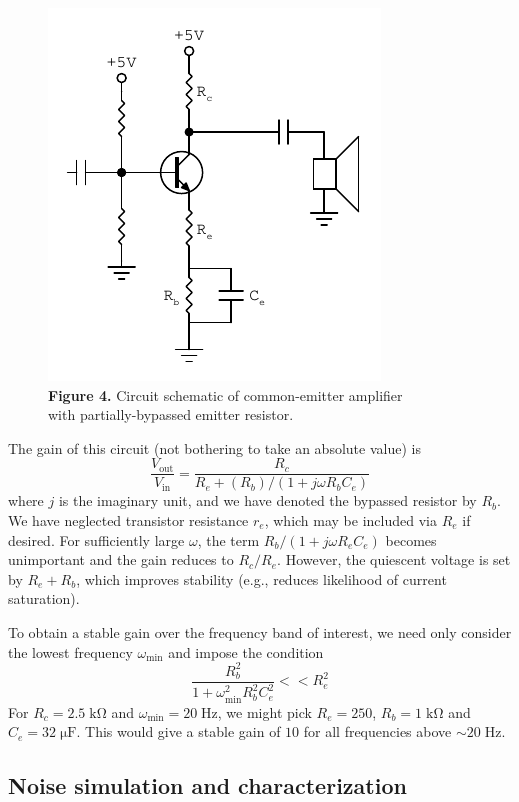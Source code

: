\documentclass[11pt]{article}
\newcommand {\mt}{\mathrm}
\newcommand {\unit}[1]{\; \mt{#1}}
\begin{document}
\begin{figure}[h]
    \centering
    \includegraphics[scale=1]{schematics/amplifier_bypass.pdf} \\
    \textbf{Figure 4.} Circuit schematic of common-emitter amplifier \\
    with partially-bypassed emitter resistor.
\end{figure}

The gain of this circuit (not bothering to take an absolute value) is
\[
  \frac{V_\mt{out}}{V_\mt{in}}
    = \frac{R_c} { R_e + (R_b)/(1+j\omega R_b C_e) }
\]
where $j$ is the imaginary unit, and we have denoted the bypassed resistor by
$R_b$.  We have neglected transistor resistance $r_e$, which may be included
via $R_e$ if desired.  For sufficiently large $\omega$, the
term $R_b/(1+j\omega R_e C_e)$ becomes unimportant and the gain reduces to
$R_c / R_e$.  However, the quiescent voltage is set by $R_e + R_b$, which
improves stability (e.g., reduces likelihood of current saturation).

To obtain a stable gain over the frequency band of interest, we need only
consider the lowest frequency $\omega_{\mt{min}}$ and impose the condition
\[
  \frac{R_b^2}{1 + \omega_{\mt{min}}^2 R_b^2 C_e^2} << R_e^2
\]
For $R_c = 2.5 \unit{k\Omega}$ and $\omega_{\mt{min}} = 20 \unit{Hz}$, we might
pick $R_e = 250$, $R_b = 1 \unit{k\Omega}$ and $C_e = 32 \unit{\mu F}$.  This
would give a stable gain of $10$ for all frequencies above $\sim 20 \unit{Hz}$.

\subsection{Noise simulation and characterization}
\end{document}
